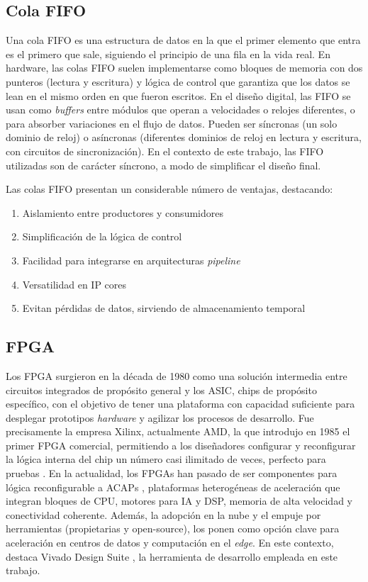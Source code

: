 \subsection{Cola FIFO}
\label{st:colasFifo}
Una cola \ac{FIFO} es una estructura de datos en la que el primer elemento que entra es el primero que sale, siguiendo el principio de una fila en la vida real. En hardware, las colas FIFO suelen implementarse como bloques de memoria con dos punteros (lectura y escritura) y lógica de control que garantiza que los datos se lean en el mismo orden en que fueron escritos. En el diseño digital, las FIFO se usan como \textit{buffers} entre módulos que operan a velocidades o relojes diferentes, o para absorber variaciones en el flujo de datos. Pueden ser síncronas (un solo dominio de reloj) o asíncronas (diferentes dominios de reloj en lectura y escritura, con circuitos de sincronización). En el contexto de este trabajo, las FIFO utilizadas son de carácter síncrono, a modo de simplificar el diseño final.

Las colas FIFO presentan un considerable número de ventajas, destacando:

\begin{enumerate}
    \item Aislamiento entre productores y consumidores
    \item Simplificación de la lógica de control
    \item Facilidad para integrarse en arquitecturas \textit{pipeline}
    \item Versatilidad en IP cores
    \item Evitan pérdidas de datos, sirviendo de almacenamiento temporal
\end{enumerate}

\subsection{FPGA}

Los \ac{FPGA} surgieron en la década de 1980 como una solución intermedia entre circuitos integrados de propósito general y los \ac{ASIC}, chips de propósito específico, con el objetivo de tener una plataforma con capacidad suficiente para desplegar prototipos \textit{hardware} y agilizar los procesos de desarrollo. Fue precisamente la empresa Xilinx, actualmente AMD, la que introdujo en 1985 el primer FPGA comercial, permitiendo a los diseñadores configurar y reconfigurar la lógica interna del chip un número casi ilimitado de veces, perfecto para pruebas \cite{historiaFPGA}. En la actualidad, los FPGAs han pasado de ser componentes para lógica reconfigurable a \ac{ACAP}s \cite{amdACAP}, plataformas heterogéneas de aceleración que integran bloques de CPU, motores para \ac{IA} y \ac{DSP}, memoria de alta velocidad y conectividad coherente. Además, la adopción en la nube y el empuje por herramientas (propietarias y open-source), los ponen como opción clave para aceleración en centros de datos y computación en el \textit{edge}. En este contexto, destaca Vivado Design Suite \cite{vivadoInfo}, la herramienta de desarrollo empleada en este trabajo.

